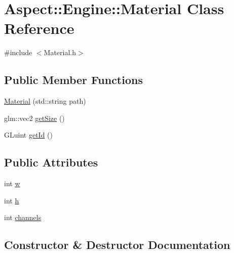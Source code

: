 \hypertarget{class_aspect_1_1_engine_1_1_material}{}\section{Aspect\+:\+:Engine\+:\+:Material Class Reference}
\label{class_aspect_1_1_engine_1_1_material}


{\ttfamily \#include $<$Material.\+h$>$}

\subsection*{Public Member Functions}
\begin{DoxyCompactItemize}
\item 
\mbox{\hyperlink{class_aspect_1_1_engine_1_1_material_a2c9f3f523dc327399c24b4222d4a978c}{Material}} (std\+::string path)
\item 
glm\+::vec2 \mbox{\hyperlink{class_aspect_1_1_engine_1_1_material_a8779008ace71c3d1ee2cd551373933be}{get\+Size}} ()
\item 
G\+Luint \mbox{\hyperlink{class_aspect_1_1_engine_1_1_material_ac4177400efde4d6ced260e707b3e5ad0}{get\+Id}} ()
\end{DoxyCompactItemize}
\subsection*{Public Attributes}
\begin{DoxyCompactItemize}
\item 
int \mbox{\hyperlink{class_aspect_1_1_engine_1_1_material_a2c52f153e9878530ae68627c9a1f16be}{w}}
\item 
int \mbox{\hyperlink{class_aspect_1_1_engine_1_1_material_a495fcbe4e64c1814971cd9d815dd0e16}{h}}
\item 
int \mbox{\hyperlink{class_aspect_1_1_engine_1_1_material_ae0b4f29080da1fdfb87763c8b72f3110}{channels}}
\end{DoxyCompactItemize}


\subsection{Constructor \& Destructor Documentation}
\mbox{\label{class_aspect_1_1_engine_1_1_material_a2c9f3f523dc327399c24b4222d4a978c}} 
